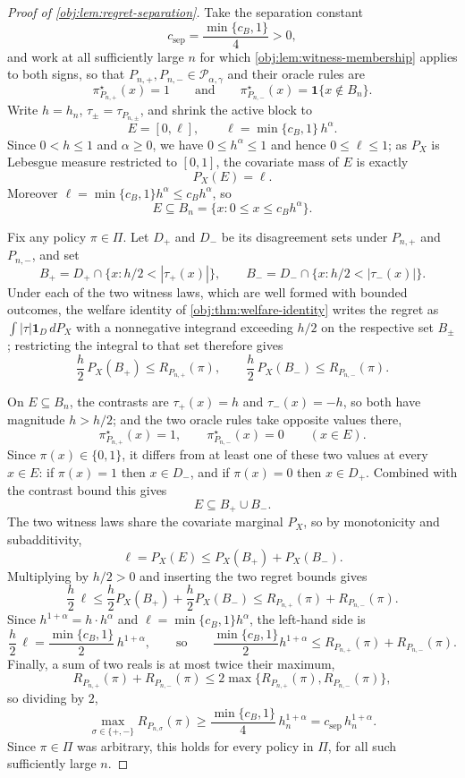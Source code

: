 \begin{proof}[Proof of \cref{obj:lem:regret-separation}]
Take the separation constant
\[
c_{\mathrm{sep}}=\frac{\min\{c_B,1\}}{4}>0,
\]
and work at all sufficiently large \(n\) for which \cref{obj:lem:witness-membership} applies to both signs, so that \(P_{n,+},P_{n,-}\in\mathcal P_{\alpha,\gamma}\) and their oracle rules are
\[
\pi^\star_{P_{n,+}}(x)=1
\qquad\text{and}\qquad
\pi^\star_{P_{n,-}}(x)=\mathbf 1\{x\notin B_n\}.
\]
Write \(h=h_n\), \(\tau_\pm=\tau_{P_{n,\pm}}\), and shrink the active block to
\[
E=[0,\ell],
\qquad
\ell=\min\{c_B,1\}\,h^\alpha .
\]
Since \(0<h\le1\) and \(\alpha\ge0\), we have \(0\le h^\alpha\le1\) and hence \(0\le\ell\le1\); as \(P_X\) is Lebesgue measure restricted to \([0,1]\), the covariate mass of \(E\) is exactly
\[
P_X(E)=\ell .
\]
Moreover \(\ell=\min\{c_B,1\}h^\alpha\le c_Bh^\alpha\), so
\[
E\subseteq B_n=\{x:0\le x\le c_Bh^\alpha\}.
\]

Fix any policy \(\pi\in\Pi\).  Let \(D_+\) and \(D_-\) be its disagreement sets under \(P_{n,+}\) and \(P_{n,-}\), and set
\[
B_+=D_+\cap\{x:h/2<|\tau_+(x)|\},
\qquad
B_-=D_-\cap\{x:h/2<|\tau_-(x)|\}.
\]
Under each of the two witness laws, which are well formed with bounded outcomes, the welfare identity of \cref{obj:thm:welfare-identity} writes the regret as \(\int|\tau|\mathbf 1_D\,dP_X\) with a nonnegative integrand exceeding \(h/2\) on the respective set \(B_\pm\); restricting the integral to that set therefore gives
\[
\frac h2\,P_X(B_+)\le R_{P_{n,+}}(\pi),
\qquad
\frac h2\,P_X(B_-)\le R_{P_{n,-}}(\pi).
\]

On \(E\subseteq B_n\), the contrasts are \(\tau_+(x)=h\) and \(\tau_-(x)=-h\), so both have magnitude \(h>h/2\); and the two oracle rules take opposite values there,
\[
\pi^\star_{P_{n,+}}(x)=1,
\qquad
\pi^\star_{P_{n,-}}(x)=0
\qquad (x\in E).
\]
Since \(\pi(x)\in\{0,1\}\), it differs from at least one of these two values at every \(x\in E\): if \(\pi(x)=1\) then \(x\in D_-\), and if \(\pi(x)=0\) then \(x\in D_+\).  Combined with the contrast bound this gives
\[
E\subseteq B_+\cup B_- .
\]
The two witness laws share the covariate marginal \(P_X\), so by monotonicity and subadditivity,
\[
\ell=P_X(E)\le P_X(B_+)+P_X(B_-).
\]
Multiplying by \(h/2>0\) and inserting the two regret bounds gives
\[
\frac h2\,\ell
\le \frac h2 P_X(B_+)+\frac h2 P_X(B_-)
\le R_{P_{n,+}}(\pi)+R_{P_{n,-}}(\pi).
\]
Since \(h^{1+\alpha}=h\cdot h^\alpha\) and \(\ell=\min\{c_B,1\}h^\alpha\), the left-hand side is
\[
\frac h2\,\ell=\frac{\min\{c_B,1\}}{2}\,h^{1+\alpha},
\qquad\text{so}\qquad
\frac{\min\{c_B,1\}}{2}h^{1+\alpha}
\le R_{P_{n,+}}(\pi)+R_{P_{n,-}}(\pi).
\]
Finally, a sum of two reals is at most twice their maximum,
\[
R_{P_{n,+}}(\pi)+R_{P_{n,-}}(\pi)
\le 2\max\{R_{P_{n,+}}(\pi),R_{P_{n,-}}(\pi)\},
\]
so dividing by \(2\),
\[
\max_{\sigma\in\{+,-\}}R_{P_{n,\sigma}}(\pi)
\ge \frac{\min\{c_B,1\}}{4}\,h_n^{1+\alpha}
= c_{\mathrm{sep}}\,h_n^{1+\alpha}.
\]
Since \(\pi\in\Pi\) was arbitrary, this holds for every policy in \(\Pi\), for all such sufficiently large \(n\). %
\end{proof}

